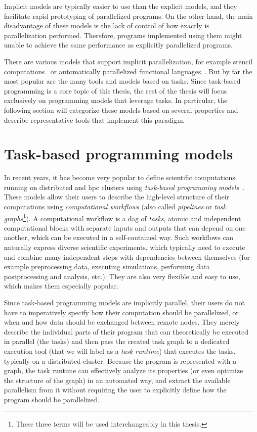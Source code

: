 Implicit models are typically easier to use than the explicit models, and they facilitate rapid
prototyping of parallelized programs. On the other hand, the main disadvantage of these models is
the lack of control of how exactly is parallelization performed. Therefore, programs implemented
using them might unable to achieve the same performance as explicitly parallelized programs.

There are various models that support implicit parallelization, for example stencil
computations~\cite{stencil} or automatically parallelized functional
languages~\cite{parallel_haskell}. But by far the most popular are the many tools and models based
on tasks. Since task-based programming is a core topic of this thesis, the rest of the thesis will
focus exclusively on programming models that leverage tasks. In particular, the following section
will categorize these models based on several properties and describe representative tools that
implement this paradigm.

\section{Task-based programming models}
In recent years, it has become very popular to define scientific computations running on
distributed and \gls{hpc} clusters using
\emph{task-based programming models}~\cite{pegasus,workflows1,workflows_at_scale}. These models allow their users to describe the
high-level structure of their computations using \emph{computational workflows} (also called \emph{pipelines} or \emph{task graphs}\footnote{These three terms will be used interchangeably in this thesis.}). A computational workflow
is a \gls{dag} of \emph{tasks}, atomic and independent computational
blocks with separate inputs and outputs that can depend on one another, which can be executed in a
self-contained way. Such workflows can naturally express diverse scientific experiments, which
typically need to execute and combine many independent steps with dependencies between themselves
(for example preprocessing data, executing simulations, performing data postprocessing and
analysis, etc.). They are also very flexible and easy to use, which makes them especially popular.

Since task-based programming models are implicitly parallel, their users do not have to
imperatively specify how their computation should be parallelized, or when and how data should be
exchanged between remote nodes. They merely describe the individual parts of their program that can
theoretically be executed in parallel (the tasks) and then pass the created task graph to a
dedicated execution tool (that we will label as a \emph{task runtime}) that executes the tasks,
typically on a distributed cluster. Because the program is represented with a graph, the task
runtime can effectively analyze its properties (or even optimize the structure of the graph) in an
automated way, and extract the available parallelism from it without requiring the user to
explicitly define how the program should be parallelized.

